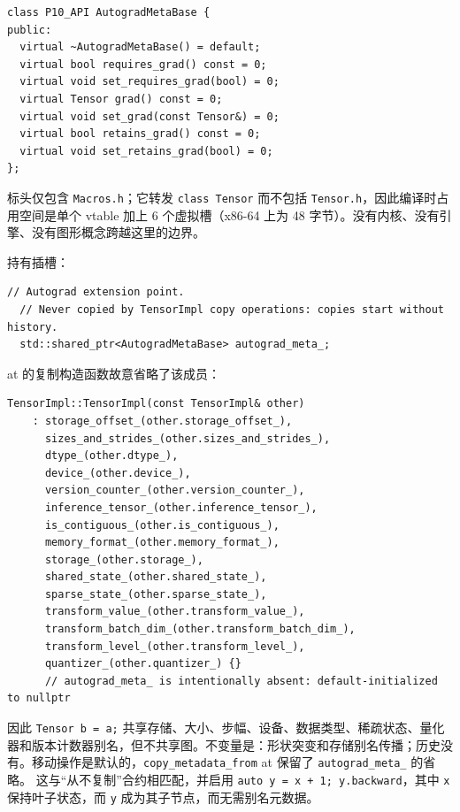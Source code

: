 \begin{lstlisting}[caption={the pure interface.}, label=lst:autogradbase2]
class P10_API AutogradMetaBase {
public:
  virtual ~AutogradMetaBase() = default;
  virtual bool requires_grad() const = 0;
  virtual void set_requires_grad(bool) = 0;
  virtual Tensor grad() const = 0;
  virtual void set_grad(const Tensor&) = 0;
  virtual bool retains_grad() const = 0;
  virtual void set_retains_grad(bool) = 0;
};
\end{lstlisting}

标头仅包含 \texttt{Macros.h}；它转发 \texttt{class Tensor} 而不包括 \texttt{Tensor.h}，因此编译时占用空间是单个 vtable 加上 6 个虚拟槽（x86-64 上为 48 字节）。没有内核、没有引擎、没有图形概念跨越这里的边界。

持有插槽：

\begin{lstlisting}[caption={never-copied owner.}, label=lst:implslot]
  // Autograd extension point.
  // Never copied by TensorImpl copy operations: copies start without history.
  std::shared_ptr<AutogradMetaBase> autograd_meta_;
\end{lstlisting}

at 的复制构造函数故意省略了该成员：

\begin{lstlisting}[caption={history is not duplicated.}, label=lst:copyctor]
TensorImpl::TensorImpl(const TensorImpl& other)
    : storage_offset_(other.storage_offset_),
      sizes_and_strides_(other.sizes_and_strides_),
      dtype_(other.dtype_),
      device_(other.device_),
      version_counter_(other.version_counter_),
      inference_tensor_(other.inference_tensor_),
      is_contiguous_(other.is_contiguous_),
      memory_format_(other.memory_format_),
      storage_(other.storage_),
      shared_state_(other.shared_state_),
      sparse_state_(other.sparse_state_),
      transform_value_(other.transform_value_),
      transform_batch_dim_(other.transform_batch_dim_),
      transform_level_(other.transform_level_),
      quantizer_(other.quantizer_) {}
      // autograd_meta_ is intentionally absent: default-initialized to nullptr
\end{lstlisting}

因此 \texttt{Tensor b = a;} 共享存储、大小、步幅、设备、数据类型、稀疏状态、量化器和版本计数器别名，但不共享图。不变量是：形状突变和存储别名传播；历史没有。移动操作是默认的，\texttt{copy\_metadata\_from} at 保留了 \texttt{autograd\_meta\_} 的省略。
这与“从不复制”合约相匹配，并启用 \texttt{auto y = x + 1; y.backward}，其中 \texttt{x} 保持叶子状态，而 \texttt{y} 成为其子节点，而无需别名元数据。

